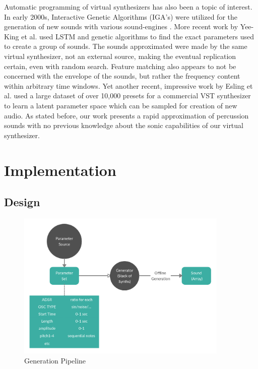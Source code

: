 \documentclass{nime-alternate} %
\begin{document}
Automatic programming of virtual synthesizers has also been a topic of interest. In early 2000s, Interactive Genetic Algorithms (IGA's) were utilized for the generation of new sounds with various sound-engines \cite{johnson1999exploring,dahlstedt2001creating}. More recent work by Yee-King et al. \cite{yee2018automatic} used LSTM and genetic algorithms to find the exact parameters used to create a group of sounds. The sounds approximated were made by the same virtual synthesizer, not an external source, making the eventual replication certain, even with random search. Feature matching also appears to not be concerned with the envelope of the sounds, but rather the frequency content within arbitrary time windows. Yet another recent, impressive work by Esling et al. used a large dataset of over 10,000 presets for a commercial VST synthesizer to learn a latent parameter space which can be sampled for creation of new audio. As stated before, our work presents a rapid approximation of percussion sounds with no previous knowledge about the sonic capabilities of our virtual synthesizer.
\section{Implementation}
\label{impl}
\subsection{Design}
 
\begin{figure}[H]
\centering
\includegraphics[width=0.9\textwidth]{images/SSS_gen.png}
\caption{Generation Pipeline}
\label{fig:SSS generator}
\end{figure}
\end{document}
